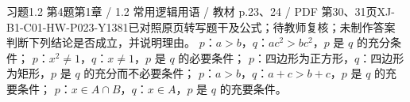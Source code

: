 \par\noindent\begin{minipage}{\linewidth}
\begin{bankitem}{习题1.2 第4题}{第1章 / 1.2 常用逻辑用语 / 教材 p.23、24 / PDF 第30、31页}{XJ-B1-C01-HW-P023-Y1381}{已对照原页转写题干及公式；待教师复核；未制作答案}
判断下列结论是否成立，并说明理由。
$p$：$a>b$，$q$：$ac^2>bc^2$，$p$ 是 $q$ 的充分条件；
$p$：$x^2\ne1$，$q$：$x\ne1$，$p$ 是 $q$ 的必要条件；
$p$：四边形为正方形，$q$：四边形为矩形，$p$ 是 $q$ 的充分而不必要条件；
$p$：$a>b$，$q$：$a+c>b+c$，$p$ 是 $q$ 的充要条件；
$p$：$x\in A\cap B$，$q$：$x\in A$，$p$ 是 $q$ 的充要条件。
\end{bankitem}
\end{minipage}\par\medskip
